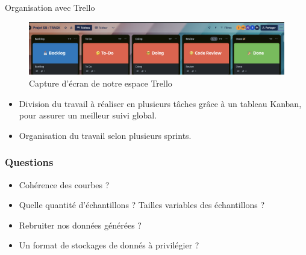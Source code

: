 \documentclass{beamer}
\begin{document}
\begin{frame}{Organisation avec Trello}

  \begin{figure}
      \centering
      \includegraphics[width=1\linewidth]{images/trello}
      \caption{Capture d'écran de notre espace Trello}
      \label{fig:trello}
  \end{figure}
  
  \begin{itemize}
      \item Division du travail à réaliser en plusieurs tâches grâce à un tableau Kanban, pour assurer un meilleur suivi global.
      \item Organisation du travail selon plusieurs sprints.
  \end{itemize}
  
\end{frame}

\begin{frame}
  \frametitle{Questions}
  \begin{itemize}
    \item Cohérence des courbes ?
    \item Quelle quantité d'échantillons ? Tailles variables des échantillons ?
    \item Rebruiter nos données générées ? 
    \item Un format de stockages de donnés à privilégier ?
  \end{itemize}
\end{frame}

\end{document}
